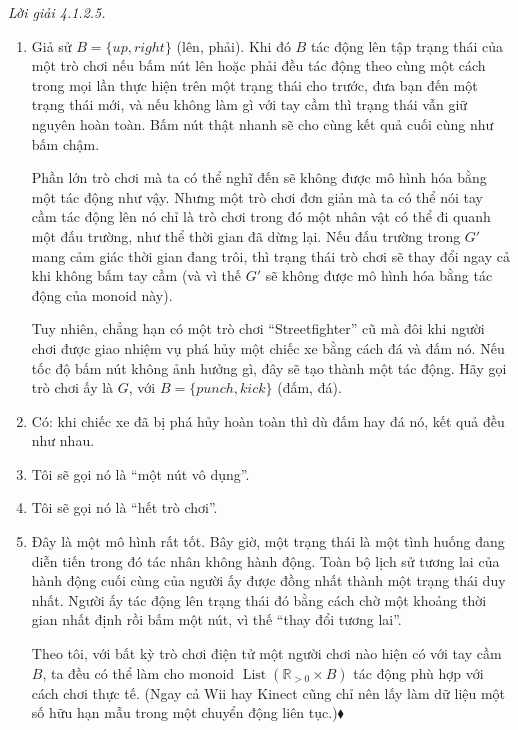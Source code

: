 \noindent\textit{Lời giải 4.1.2.5.}\keepwithnext
\begin{enumerate}[label=\alph*.]
\item Giả sử $B=\{up,right\}$ (lên, phải). Khi đó $B$ tác động lên tập trạng thái của một trò chơi nếu bấm nút lên hoặc phải đều tác động theo cùng một cách trong mọi lần thực hiện trên một trạng thái cho trước, đưa bạn đến một trạng thái mới, và nếu không làm gì với tay cầm thì trạng thái vẫn giữ nguyên hoàn toàn. Bấm nút thật nhanh sẽ cho cùng kết quả cuối cùng như bấm chậm.

Phần lớn trò chơi mà ta có thể nghĩ đến sẽ không được mô hình hóa bằng một tác động như vậy. Nhưng một trò chơi đơn giản mà ta có thể nói tay cầm tác động lên nó chỉ là trò chơi trong đó một nhân vật có thể đi quanh một đấu trường, như thể thời gian đã dừng lại. Nếu đấu trường trong $G'$ mang cảm giác thời gian đang trôi, thì trạng thái trò chơi sẽ thay đổi ngay cả khi không bấm tay cầm (và vì thế $G'$ sẽ không được mô hình hóa bằng tác động của monoid này).

Tuy nhiên, chẳng hạn có một trò chơi ``Streetfighter'' cũ mà đôi khi người chơi được giao nhiệm vụ phá hủy một chiếc xe bằng cách đá và đấm nó. Nếu tốc độ bấm nút không ảnh hưởng gì, đây sẽ tạo thành một tác động. Hãy gọi trò chơi ấy là $G$, với $B=\{punch,kick\}$ (đấm, đá).
\item Có: khi chiếc xe đã bị phá hủy hoàn toàn thì dù đấm hay đá nó, kết quả đều như nhau.
\item Tôi sẽ gọi nó là ``một nút vô dụng''.
\item Tôi sẽ gọi nó là ``hết trò chơi''.
\item Đây là một mô hình rất tốt. Bây giờ, một trạng thái là một tình huống đang diễn tiến trong đó tác nhân không hành động. Toàn bộ lịch sử tương lai của hành động cuối cùng của người ấy được đồng nhất thành một trạng thái duy nhất. Người ấy tác động lên trạng thái đó bằng cách chờ một khoảng thời gian nhất định rồi bấm một nút, vì thế ``thay đổi tương lai''.

Theo tôi, với bất kỳ trò chơi điện tử một người chơi nào hiện có với tay cầm $B$, ta đều có thể làm cho monoid $\operatorname{List}(\mathbb{R}_{>0}\times B)$ tác động phù hợp với cách chơi thực tế. (Ngay cả Wii hay Kinect cũng chỉ nên lấy làm dữ liệu một số hữu hạn mẫu trong một chuyển động liên tục.)\nobreak\hfill$\blacklozenge$
\end{enumerate}

